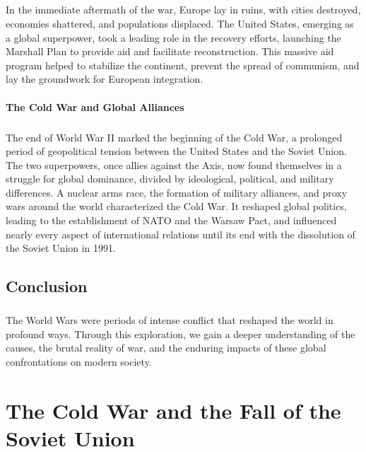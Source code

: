 \documentclass[a4paper,12pt]{book}
\begin{document}
\paragraph{}
In the immediate aftermath of the war, Europe lay in ruins, with cities destroyed, economies shattered, and populations displaced. The United States, emerging as a global superpower, took a leading role in the recovery efforts, launching the Marshall Plan to provide aid and facilitate reconstruction. This massive aid program helped to stabilize the continent, prevent the spread of communism, and lay the groundwork for European integration. 

\subsubsection*{The Cold War and Global Alliances}
\paragraph{}
The end of World War II marked the beginning of the Cold War, a prolonged period of geopolitical tension between the United States and the Soviet Union. The two superpowers, once allies against the Axis, now found themselves in a struggle for global dominance, divided by ideological, political, and military differences. A nuclear arms race, the formation of military alliances, and proxy wars around the world characterized the Cold War. It reshaped global politics, leading to the establishment of NATO and the Warsaw Pact, and influenced nearly every aspect of international relations until its end with the dissolution of the Soviet Union in 1991. 

\section*{Conclusion}
\paragraph{}
The World Wars were periods of intense conflict that reshaped the world in profound ways. Through this exploration, we gain a deeper understanding of the causes, the brutal reality of war, and the enduring impacts of these global confrontations on modern society.

\chapter{The Cold War and the Fall of the Soviet Union}
\end{document}
